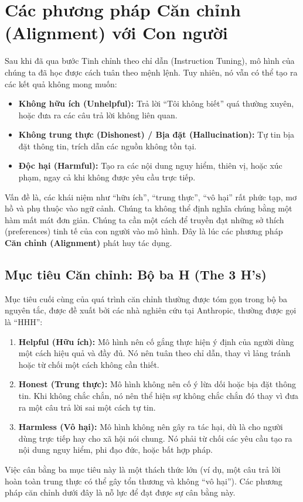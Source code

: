 
\section{Các phương pháp Căn chỉnh (Alignment) với Con người}
\label{sec:alignment_methods}

Sau khi đã qua bước Tinh chỉnh theo chỉ dẫn (Instruction Tuning), mô hình của chúng ta đã học được cách tuân theo mệnh lệnh. Tuy nhiên, nó vẫn có thể tạo ra các kết quả không mong muốn:
\begin{itemize}
    \item \textbf{Không hữu ích (Unhelpful):} Trả lời “Tôi không biết” quá thường xuyên, hoặc đưa ra các câu trả lời không liên quan.
    \item \textbf{Không trung thực (Dishonest) / Bịa đặt (Hallucination):} Tự tin bịa đặt thông tin, trích dẫn các nguồn không tồn tại.
    \item \textbf{Độc hại (Harmful):} Tạo ra các nội dung nguy hiểm, thiên vị, hoặc xúc phạm, ngay cả khi không được yêu cầu trực tiếp.
\end{itemize}

Vấn đề là, các khái niệm như “hữu ích”, “trung thực”, “vô hại” rất phức tạp, mơ hồ và phụ thuộc vào ngữ cảnh. Chúng ta không thể định nghĩa chúng bằng một hàm mất mát đơn giản. Chúng ta cần một cách để truyền đạt những sở thích (preferences) tinh tế của con người vào mô hình. Đây là lúc các phương pháp \textbf{Căn chỉnh (Alignment)} phát huy tác dụng.

\subsection{Mục tiêu Căn chỉnh: Bộ ba H (The 3 H's)}
\label{ssec:alignment_goals}
Mục tiêu cuối cùng của quá trình căn chỉnh thường được tóm gọn trong bộ ba nguyên tắc, được đề xuất bởi các nhà nghiên cứu tại Anthropic, thường được gọi là “HHH”:
\begin{enumerate}
    \item \textbf{Helpful (Hữu ích):} Mô hình nên cố gắng thực hiện ý định của người dùng một cách hiệu quả và đầy đủ. Nó nên tuân theo chỉ dẫn, thay vì lảng tránh hoặc từ chối một cách không cần thiết.
    \item \textbf{Honest (Trung thực):} Mô hình không nên cố ý lừa dối hoặc bịa đặt thông tin. Khi không chắc chắn, nó nên thể hiện sự không chắc chắn đó thay vì đưa ra một câu trả lời sai một cách tự tin.
    \item \textbf{Harmless (Vô hại):} Mô hình không nên gây ra tác hại, dù là cho người dùng trực tiếp hay cho xã hội nói chung. Nó phải từ chối các yêu cầu tạo ra nội dung nguy hiểm, phi đạo đức, hoặc bất hợp pháp.
\end{enumerate}
Việc cân bằng ba mục tiêu này là một thách thức lớn (ví dụ, một câu trả lời hoàn toàn trung thực có thể gây tổn thương và không “vô hại”). Các phương pháp căn chỉnh dưới đây là nỗ lực để đạt được sự cân bằng này.

